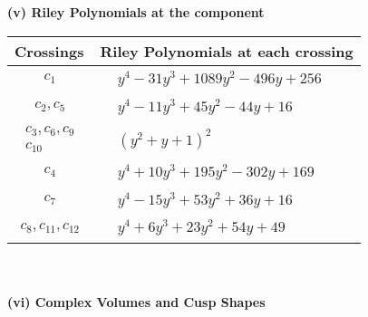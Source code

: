 \documentclass[1p]{elsarticle_modified}
\theoremstyle{definition}
\begin{document}
\newpage\renewcommand{\arraystretch}{1}
\flushleft \textbf{(v) Riley Polynomials at the component}\newline \\
\begin{tabular}{m{50pt}|m{274pt}}
Crossings & \hspace{64pt}Riley Polynomials at each crossing \\
\hline $$\begin{aligned}c_{1}\end{aligned}$$&$\begin{aligned}
&y^4-31 y^3+1089 y^2-496 y+256
\end{aligned}$\\
\hline $$\begin{aligned}c_{2},c_{5}\end{aligned}$$&$\begin{aligned}
&y^4-11 y^3+45 y^2-44 y+16
\end{aligned}$\\
\hline $$\begin{aligned}c_{3},c_{6},c_{9}\\c_{10}\end{aligned}$$&$\begin{aligned}
&(y^2+y+1)^2
\end{aligned}$\\
\hline $$\begin{aligned}c_{4}\end{aligned}$$&$\begin{aligned}
&y^4+10 y^3+195 y^2-302 y+169
\end{aligned}$\\
\hline $$\begin{aligned}c_{7}\end{aligned}$$&$\begin{aligned}
&y^4-15 y^3+53 y^2+36 y+16
\end{aligned}$\\
\hline $$\begin{aligned}c_{8},c_{11},c_{12}\end{aligned}$$&$\begin{aligned}
&y^4+6 y^3+23 y^2+54 y+49
\end{aligned}$\\
\hline
\end{tabular}\\~\\
\newpage\flushleft \textbf{(vi) Complex Volumes and Cusp Shapes}
\end{document}
